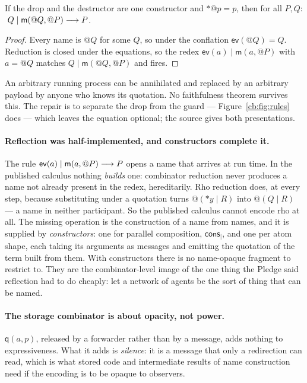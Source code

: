 \begin{proposition}
\label{cb:prop:defect}
If the drop and the destructor are one constructor and $*@p = p$, then for all $P,Q$:
$\;Q \mid \mathsf{m}(@Q,@P) \longrightarrow P$.
\end{proposition}

\begin{proof}
Every name is $@Q$ for some $Q$, so under the conflation $\mathsf{ev}(@Q) = Q$. Reduction
is closed under the equations, so the redex $\mathsf{ev}(a) \mid \mathsf{m}(a,@P)$ with
$a=@Q$ matches $Q \mid \mathsf{m}(@Q,@P)$ and fires.
\end{proof}

An arbitrary running process can be annihilated and replaced by an arbitrary payload by
anyone who knows its quotation. No faithfulness theorem survives this. The repair is to
separate the drop from the guard --- Figure~\ref{cb:fig:rules} does --- which leaves the
equation optional; the source gives both presentations.

\paragraph{Reflection was half-implemented, and constructors complete it.} The rule
$\mathsf{ev}(a) \mid \mathsf{m}(a,@P) \longrightarrow P$ opens a name that arrives at run time.
In the published calculus nothing \emph{builds} one: combinator reduction never produces
a name not already present in the redex, hereditarily. Rho reduction does, at every step,
because substituting under a quotation turns $@(*y \mid R)$ into $@(Q \mid R)$ --- a name in
neither participant. So the published calculus cannot encode rho at all. The missing
operation is the construction of a name from names, and it is supplied by
\emph{constructors}: one for parallel composition, $\mathsf{cons}_{\mid}$, and one per atom
shape, each taking its arguments as messages and emitting the quotation of the term built
from them. With constructors there is no name-opaque fragment to restrict to. They are the
combinator-level image of the one thing the Pledge said reflection had to do cheaply: let
a network of agents be the sort of thing that can be named.

\paragraph{The storage combinator is about opacity, not power.} $\mathsf{q}(a,p)$, released
by a forwarder rather than by a message, adds nothing to expressiveness. What it adds is
\emph{silence}: it is a message that only a redirection can read, which is what stored code
and intermediate results of name construction need if the encoding is to be opaque to
observers.

